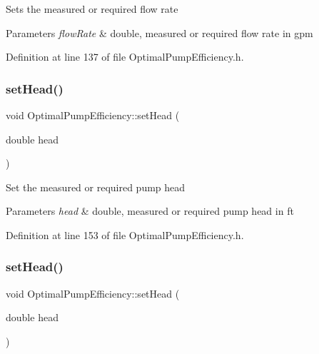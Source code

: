 Sets the measured or required flow rate 
\begin{DoxyParams}{Parameters}
{\em flow\+Rate} & double, measured or required flow rate in gpm \\
\hline
\end{DoxyParams}


Definition at line 137 of file Optimal\+Pump\+Efficiency.\+h.

\mbox{\label{class_optimal_pump_efficiency_ac317c900ec68797cf051977147ea33da}} 
\subsubsection{\texorpdfstring{set\+Head()}{setHead()}\hspace{0.1cm}{\footnotesize\ttfamily [1/3]}}
{\footnotesize\ttfamily void Optimal\+Pump\+Efficiency\+::set\+Head (\begin{DoxyParamCaption}\item[{double}]{head }\end{DoxyParamCaption})\hspace{0.3cm}{\ttfamily [inline]}}

Set the measured or required pump head 
\begin{DoxyParams}{Parameters}
{\em head} & double, measured or required pump head in ft \\
\hline
\end{DoxyParams}


Definition at line 153 of file Optimal\+Pump\+Efficiency.\+h.

\mbox{\label{class_optimal_pump_efficiency_ac317c900ec68797cf051977147ea33da}} 
\subsubsection{\texorpdfstring{set\+Head()}{setHead()}\hspace{0.1cm}{\footnotesize\ttfamily [2/3]}}
{\footnotesize\ttfamily void Optimal\+Pump\+Efficiency\+::set\+Head (\begin{DoxyParamCaption}\item[{double}]{head }\end{DoxyParamCaption})\hspace{0.3cm}{\ttfamily [inline]}}

